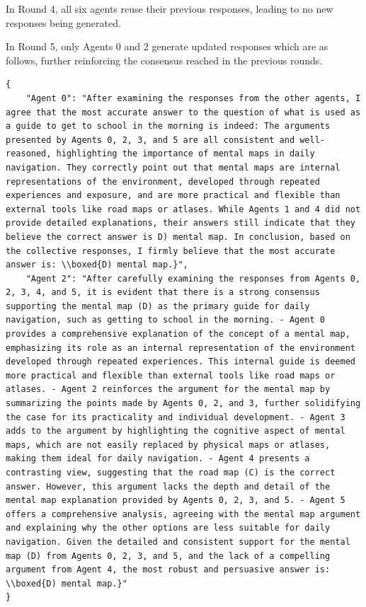 In Round 4, all six agents reuse their previous responses, leading to no new responses being generated. 

In Round 5, only Agents 0 and 2 generate updated responses which are as follows, further reinforcing the consensus reached in the previous rounds.

\begin{lstlisting}
{
    "Agent 0": "After examining the responses from the other agents, I agree that the most accurate answer to the question of what is used as a guide to get to school in the morning is indeed: The arguments presented by Agents 0, 2, 3, and 5 are all consistent and well-reasoned, highlighting the importance of mental maps in daily navigation. They correctly point out that mental maps are internal representations of the environment, developed through repeated experiences and exposure, and are more practical and flexible than external tools like road maps or atlases. While Agents 1 and 4 did not provide detailed explanations, their answers still indicate that they believe the correct answer is D) mental map. In conclusion, based on the collective responses, I firmly believe that the most accurate answer is: \\boxed{D) mental map.}",
    "Agent 2": "After carefully examining the responses from Agents 0, 2, 3, 4, and 5, it is evident that there is a strong consensus supporting the mental map (D) as the primary guide for daily navigation, such as getting to school in the morning. - Agent 0 provides a comprehensive explanation of the concept of a mental map, emphasizing its role as an internal representation of the environment developed through repeated experiences. This internal guide is deemed more practical and flexible than external tools like road maps or atlases. - Agent 2 reinforces the argument for the mental map by summarizing the points made by Agents 0, 2, and 3, further solidifying the case for its practicality and individual development. - Agent 3 adds to the argument by highlighting the cognitive aspect of mental maps, which are not easily replaced by physical maps or atlases, making them ideal for daily navigation. - Agent 4 presents a contrasting view, suggesting that the road map (C) is the correct answer. However, this argument lacks the depth and detail of the mental map explanation provided by Agents 0, 2, 3, and 5. - Agent 5 offers a comprehensive analysis, agreeing with the mental map argument and explaining why the other options are less suitable for daily navigation. Given the detailed and consistent support for the mental map (D) from Agents 0, 2, 3, and 5, and the lack of a compelling argument from Agent 4, the most robust and persuasive answer is: \\boxed{D) mental map.}"
}
\end{lstlisting}

